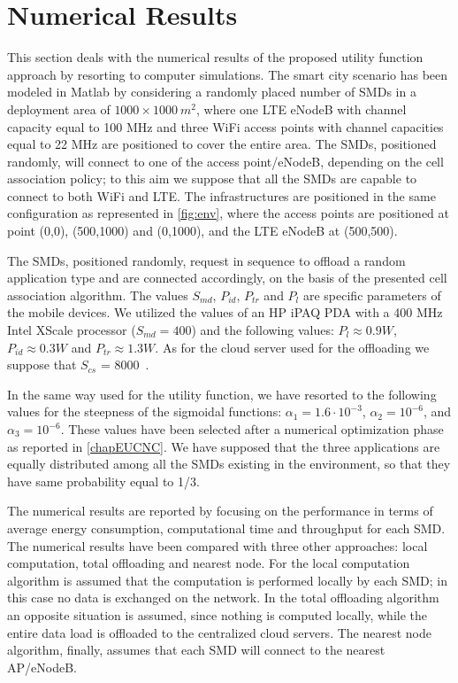 \documentclass[twoside,openright]{report}
\begin{document}
\section{Numerical Results}
\label{sec:numerical}
This section deals with the numerical results of the proposed utility function approach by resorting to computer simulations. The smart city scenario has been modeled in Matlab by considering a randomly placed number of \glspl{SMD} in a deployment area of $1000\times1000\ m^2$, where one \gls{LTE} eNodeB with channel capacity equal to 100 MHz and three \gls{WiFi} access points with channel capacities equal to 22 MHz are positioned to cover the entire area. The \glspl{SMD}, positioned randomly, will connect to one of the access point/eNodeB, depending on the cell association policy; to this aim we suppose that all the \glspl{SMD} are capable to connect to both \gls{WiFi} and \gls{LTE}. The infrastructures are positioned in the same configuration as represented in \autoref{fig:env}, where the access points are positioned at point (0,0), (500,1000) and (0,1000), and the \gls{LTE} eNodeB at (500,500). 

The \glspl{SMD}, positioned randomly, request in sequence to offload a random application type and are connected accordingly, on the basis of the presented cell association algorithm.
The values $S_{\textit{md}}$, $P_{\textit{id}}$, $P_{\textit{tr}}$ and $P_l$ are specific parameters of the mobile devices. 
We utilized the values of an HP iPAQ PDA with a 400 MHz Intel XScale processor ($S_{\textit{md}}=400$) and the following values: $P_l\approx0.9 W$, $P_{\textit{id}}\approx0.3 W$ and $P_{\textit{tr}}\approx1.3 W$. 
As for the cloud server used for the offloading we suppose that $S_{cs}$ = 8000~\cite{Kumar}.

In the same way used for the utility function, we have resorted to the following values for the  steepness of the sigmoidal functions: $\alpha_1 = 1.6\cdot 10^{-3}$, $\alpha_2 = 10^{-6}$, and $\alpha_3 = 10^{-6}$. 
These values have been selected after a numerical optimization phase as reported in \autoref{chapEUCNC}. 
We have supposed that the three applications are equally distributed among all the \glspl{SMD} existing in the environment, so that they have same probability equal to 1/3.

The numerical results are reported by focusing on the performance in terms of average energy consumption, computational time and throughput for each \gls{SMD}.
The numerical results have been compared with three other approaches: local computation, total offloading and nearest node. 
For the local computation algorithm is assumed that the computation is performed locally by each \gls{SMD}; in this case no data is exchanged on the network. In the total offloading algorithm an opposite situation is assumed, since nothing is computed  locally, while the entire data load is offloaded to the centralized cloud servers. The nearest node algorithm, finally, assumes that each \gls{SMD} will connect to the nearest AP/eNodeB.
\end{document}
